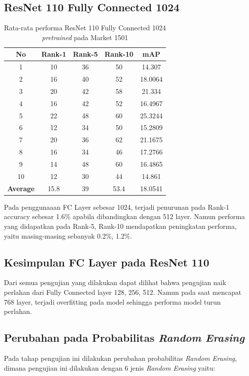 \subsection{ResNet 110 Fully Connected 1024}
\begin{longtable}{|c|c|c|c|c|}
	\caption{Rata-rata performa ResNet 110 Fully Connected 1024 \textit{pretrained} pada Market 1501 }
	\label{tabel: 17}\\
	\hline
	\rowcolor[HTML]{C0C0C0}
	\textbf{No} &\textbf{Rank-1} & \textbf{Rank-5} & \textbf{Rank-10} & \textbf{mAP} \\
	\hline
	1 &10 &36 &50 &14.307 \\
	2 &16 &40 &52 &18.0064 \\
	3 &20 &42 &58 &21.334 \\
	4 &16 &42 &52 &16.4967 \\
	5 &22 &48 &60 &25.3244 \\
	6 &12 &34 &50 &15.2809 \\
	7 &20 &36 &62 &21.1675 \\
	8 &16 &34 &46 &17.2766 \\
	9 &14 &48 &60 &16.4865 \\
	10 &12 &30 &44 &14.861 \\
	\hline
	\textbf{Average} & 15.8 & 39 & 53.4 &18.0541 \\
	\hline
\end{longtable}
Pada penggunaaan FC Layer sebesar 1024, terjadi penurunan pada Rank-1 accuracy sebesar 1.6\% apabila dibandingkan dengan 512 layer. Namun performa yang didapatkan pada Rank-5, Rank-10 mendapatkan peningkatan performa, yaitu masing-masing sebanyak 0.2\%, 1.2\%.

\subsection{Kesimpulan FC Layer pada ResNet 110}
Dari semua pengujian yang dilakukan dapat dilihat bahwa pengujian naik perlahan dari Fully Connected layer 128, 256, 512. Namun pada saat mencapat 768 layer, terjadi overfitting pada model sehingga performa model turun perlahan.

\pagebreak
\subsection{Perubahan pada Probabilitas \textit{Random Erasing}}
Pada tahap pengujian ini dilakukan perubahan probabilitas \textit{Random Erasing}, dimana pengujian ini dilakukan dengan 6 jenis \textit{Random Erasing} yaitu:

